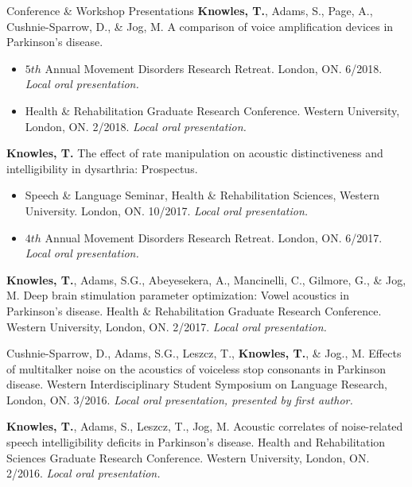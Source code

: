 \documentclass{resume} %
\begin{document}
\begin{rSection}{Conference \& Workshop Presentations}
	{\bf Knowles, T.}, Adams, S., Page, A., Cushnie-Sparrow, D., \& Jog, M. A comparison of voice amplification devices in Parkinson's disease. 
		\begin{itemize}
			\renewcommand\labelitemi{$\cdot$}
			\item $5th$ Annual Movement Disorders Research Retreat. London, ON. 6/2018. \emph{Local oral presentation.}
			\item Health \& Rehabilitation  Graduate Research Conference. Western University, London, ON. 2/2018. \emph{Local oral presentation.}
		\end{itemize}
		
	{\bf Knowles, T.} The effect of rate manipulation on acoustic distinctiveness and intelligibility in dysarthria: Prospectus. 
	\begin{itemize}
		\renewcommand\labelitemi{$\cdot$}
		\item Speech \& Language Seminar, Health \& Rehabilitation Sciences, Western University. London, ON. 10/2017. \emph{Local oral presentation.}
		\item $4th$ Annual Movement Disorders Research Retreat. London, ON. 6/2017. \emph{Local oral presentation.}
	\end{itemize}
	
	
	{\bf Knowles, T.}, Adams, S.G., Abeyesekera, A., Mancinelli, C., Gilmore, G., \& Jog, M. Deep brain stimulation parameter optimization: Vowel acoustics in Parkinson's disease. Health \& Rehabilitation Graduate Research Conference. Western University, London, ON. 2/2017. \emph{Local oral presentation.}

	Cushnie-Sparrow, D., Adams, S.G., Leszcz, T., {\bf Knowles, T.},  \& Jog., M. Effects of multitalker noise on the acoustics of voiceless stop consonants in Parkinson disease. Western Interdisciplinary Student Symposium on Language Research, London, ON. 3/2016. \emph{Local oral presentation, presented by first author.}

	{\bf Knowles, T.}, Adams, S., Leszcz, T., Jog, M. Acoustic correlates of noise-related speech intelligibility deficits in Parkinson's disease. Health and Rehabilitation Sciences Graduate Research Conference. Western University, London, ON. 2/2016. \emph{Local oral presentation.}
	

\end{rSection}
\end{document}
